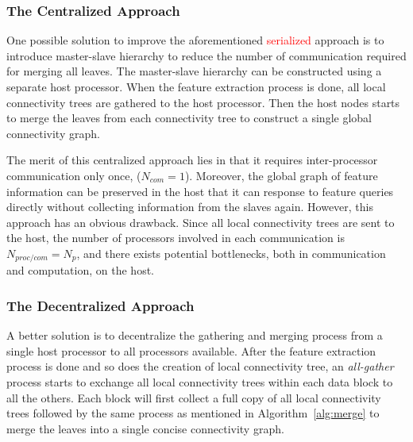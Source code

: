 \documentclass[10pt, conference, compsocconf]{IEEEtran}
\begin{document}

\subsubsection{The Centralized Approach}

One possible solution to improve the aforementioned \textcolor{red}{serialized} approach is to introduce master-slave hierarchy to reduce the number of communication required for merging all leaves. The master-slave hierarchy can be constructed using a separate host processor. When the feature extraction process is done, all local connectivity trees are gathered to the host processor. Then the host nodes starts to merge the leaves from each connectivity tree to construct a single global connectivity graph.

The merit of this centralized approach lies in that it requires inter-processor communication only once, ($N_{com} = 1$). Moreover, the global graph of feature information can be preserved in the host that it can response to feature queries directly without collecting information from the slaves again. However, this approach has an obvious drawback. Since all local connectivity trees are sent to the host, the number of processors involved in each communication is $N_{proc/com} = N_p$, and there exists potential bottlenecks, both in communication and computation, on the host. 

\subsubsection{The Decentralized Approach}

A better solution is to decentralize the gathering and merging process from a single host processor to all processors available. After the feature extraction process is done and so does the creation of local connectivity tree, an \emph{all-gather} process starts to exchange all local connectivity trees within each data block to all the others. Each block will first collect a full copy of all local connectivity trees followed by the same process as mentioned in Algorithm~\ref{alg:merge} to merge the leaves into a single concise connectivity graph.
\end{document}
